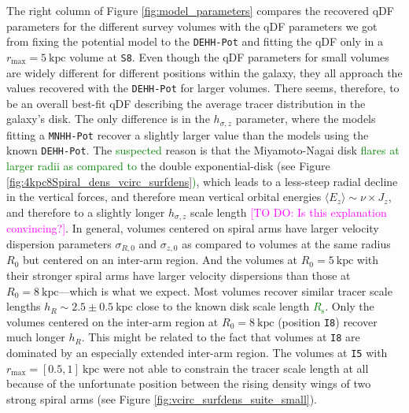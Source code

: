 \documentclass[iop,revtex4,numberedappendix,appendixfloats]{emulateapj}
\newcommand{\Wilma}[1]{\textcolor{Magenta}{#1}}
\newcommand{\NEW}[1]{\textcolor{Green}{#1}}
\newcommand{\OLD}[1]{}
\begin{document}
The right column of Figure \ref{fig:model_parameters} compares the recovered qDF parameters for the different survey volumes with the qDF parameters we got from fixing the potential model to the \texttt{DEHH-Pot} and fitting the qDF only in a $r_\text{max}=5~\text{kpc}$ volume at \texttt{S8}. Even though the qDF parameters for small volumes are widely different for different positions within the galaxy, they all approach the values recovered with the \texttt{DEHH-Pot} for larger volumes. There seems, therefore, to be an overall best-fit qDF describing the average tracer distribution in the galaxy's disk. The only difference is in the $h_{\sigma,z}$ parameter, where the models fitting a \texttt{MNHH-Pot} recover a slightly larger value than the models using the known \texttt{DEHH-Pot}. The \NEW{suspected} reason is that the Miyamoto-Nagai disk \OLD{has a different radial profile than}\NEW{flares at larger radii as compared to} the double exponential-disk (see Figure \OLD{\ref{fig:4kpc8Spiral_density}}\NEW{\ref{fig:4kpc8Spiral_dens_vcirc_surfdens})}, which leads to a less-steep radial decline in the vertical forces, and therefore mean vertical orbital energies $\langle E_z \rangle \sim \nu \times J_z$, and therefore to a slightly longer $h_{\sigma,z}$ scale length \Wilma{[TO DO: Is this explanation convincing?]}. In general, volumes centered on spiral arms have larger velocity dispersion parameters $\sigma_{R,0}$ and $\sigma_{z,0}$ as compared to volumes at the same radius $R_0$ but centered on an inter-arm region. And the volumes at $R_0=5~\text{kpc}$ with their stronger spiral arms have larger velocity dispersions than those at $R_0=8~\text{kpc}$---which is what we expect. Most volumes recover similar tracer scale lengths $h_R\sim2.5\pm0.5~\text{kpc}$ close to the known disk scale length \NEW{$R_\text{s}$}. Only the volumes centered on the inter-arm region at $R_0=8~\text{kpc}$ (position \texttt{I8}) recover much longer $h_R$. This might be related to the fact that volumes at \texttt{I8} are dominated by an especially extended inter-arm region. The volumes at \texttt{I5} with $r_\text{max}=[0.5,1]~\text{kpc}$ were not able to constrain the tracer scale length at all because of the unfortunate position between the rising density wings of two strong spiral arms (see Figure \ref{fig:vcirc_surfdens_suite_small}).
\end{document}
